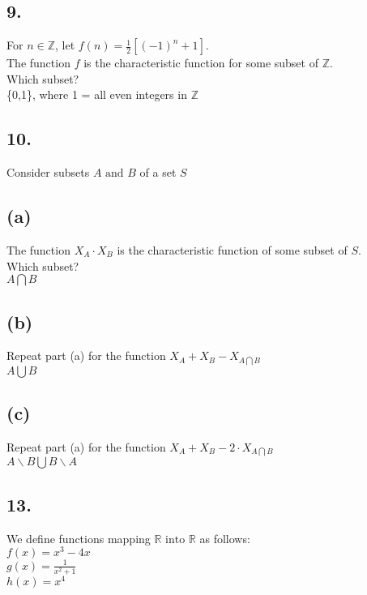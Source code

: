 \documentclass[11pt]{article}
\begin{document}
\subsection*{9.}
\begin{center}
For $n \in \mathbb{Z}$, let $f(n) = \frac{1}{2}[(-1)^{n} + 1]$.\\
The function $f$ is the characteristic function for some subset of $\mathbb{Z}$.\\
Which subset?\\
\hfill \break
\{0,1\}, where 1 = all even integers in $\mathbb{Z}$
\end{center}
%
%
\hfill \break
\subsection*{10.}
\begin{center}
Consider subsets $A \text{ and } B$ of a set $S$
\end{center}

\subsection*{(a)}
\begin{center}
The function $X_{A} \cdot X_{B}$ is the characteristic function of some subset of $S$.\\
Which subset?\\
\hfill \break
$A \bigcap B$
\end{center}

\subsection*{(b)}
\begin{center}
Repeat part (a) for the function $X_{A} + X_{B} - X_{A \bigcap B}$\\
\hfill \break
$A \bigcup B$
\end{center}

\subsection*{(c)}
\begin{center}
Repeat part (a) for the function $X_{A} + X_{B} - 2 \cdot X_{A \bigcap B}$\\
\hfill \break
$A \backslash B \bigcup B \backslash A$
\end{center}
%
%
\subsection*{13.}
\begin{center}
We define functions mapping $\mathbb{R} \text{ into } \mathbb{R}$ as follows:\\
$f(x) = x^{3} - 4x$\\
$g(x) = \frac{1}{x^{2} + 1}$\\
$h(x) = x^{4}$
\end{center}
\end{document}

